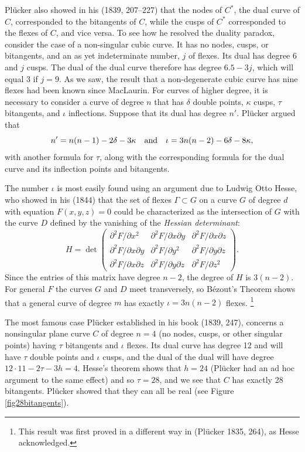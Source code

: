 Pl\"ucker also showed in his (1839, 207--227) that the nodes of $C^{*}$,
the dual curve of $C$,  corresponded to the bitangents of $C$, while
the cusps of $C^{*}$ corresponded to the flexes of $C$, and vice
versa. To see how he resolved the duality paradox, consider  the case
of a non-singular cubic curve. It has no nodes, cusps, or bitangents,
and an as yet indeterminate number, $j$ of flexes. Its dual has degree 6
and $j$ cusps. The dual of the dual curve therefore has degree $6.5 - 3j$,
which will equal 3 if $j = 9$. As we saw, the result that a non-degenerate
cubic curve has nine flexes had been known since MacLaurin. For curves of
higher degree, it is necessary to consider a curve of degree $n$ that has
$\delta$ double points, $\kappa$ cusps, $\tau$ bitangents, and $\iota$
inflections. Suppose that its dual has degree $n'$. Pl\"ucker argued that
$$
n' = n(n-1) - 2\delta - 3 \kappa
\quad
\hbox{and}\quad \iota = 3n(n-2) - 6\delta - 8\kappa,
$$
with another formula for $\tau$, along with the corresponding formula
for the dual curve and its inflection points and bitangents.

The number $\iota$ is most easily found using an argument due to
Ludwig Otto Hesse, who showed  in his (1844)  that the set of flexes
$\Gamma\subset G$ on a curve $G$ of degree $d$ with equation $F(x, y, z)
= 0$ could be characterized as the intersection of $G$  with the curve
$D$ defined by the vanishing of the \emph{Hessian determinant}:
$$
H = \det \begin{pmatrix}
 \partial^{2}F/\partial x^{2} &\partial^{2}F/\partial x\partial y
 &\partial^{2}F/\partial x\partial z \\
\partial^{2}F/\partial x\partial y  &\partial^{2}F/\partial y^{2}
&\partial^{2}F/\partial y\partial z \\
\partial^{2}F/\partial x\partial z &\partial^{2}F/\partial y\partial z
&\partial^{2}F/\partial z^{2}
\end{pmatrix}.
$$
Since the entries of this matrix have degree $n-2$, the degree of $H$
is $3(n-2)$. For general $F$ the curves $G$ and $D$ meet transversely, so
B\'ezout's Theorem shows that a general curve of degree $m$ has exactly
$\iota = 3n(n-2)$ flexes.%
%
\footnote{This result was first proved in a
different way in (Pl\"ucker 1835, 264), as Hesse acknowledged.}

The most famous case Pl\"ucker established in  his book (1839, 247),
concerns   a nonsingular plane curve $C$ of degree $n=4$  (no nodes,
cusps, or other singular points) having $\tau$ bitangents and $\iota$
flexes.   Its dual curve has degree 12 and will have $\tau$ double points
and $\iota$ cusps, and the dual of the dual will have degree
$12\cdot 11 - 2\tau - 3h  = 4$.
Hesse's theorem shows that $h = 24$ (Pl\"ucker  had an ad hoc argument to
the same effect)  and so $\tau = 28$,  and we  see that $C$ has exactly
28 bitangents. Pl\"ucker showed that they can all be real (see Figure
\ref{fig28bitangents}).

